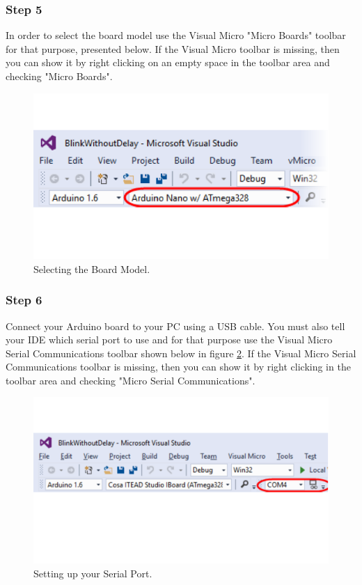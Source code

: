 \begin{refsection}
	
	\subsubsection{Step 5}
	
	In order to select the board model use the Visual Micro "Micro Boards" toolbar for that purpose, presented below. If the Visual Micro toolbar is missing, then you can show it by right clicking on an empty space in the toolbar area and checking "Micro Boards".
	
	
	\begin{figure}[H]
		\centering
		\includegraphics[width=0.7\linewidth]{./sdf/arduino_quantum_rx/figures/boardSelect.pdf}
		\caption{Selecting the Board Model.}
		\label{boardSelect}
	\end{figure}
	
	\subsubsection{Step 6}
	
	Connect your Arduino board to your PC using a USB cable. You must also tell your IDE which serial port to use and for that purpose use the Visual Micro Serial Communications toolbar shown below in figure \ref{selectSerial}. If the Visual Micro Serial Communications toolbar is missing, then you can show it by right clicking in the toolbar area and checking "Micro Serial Communications".
	
	\begin{figure}[H]
		\centering
		\includegraphics[width=0.7\linewidth]{./sdf/arduino_quantum_rx/figures/selectSerial.pdf}
		\caption{Setting up your Serial Port.}
		\label{selectSerial}
	\end{figure}
	

\end{refsection}
